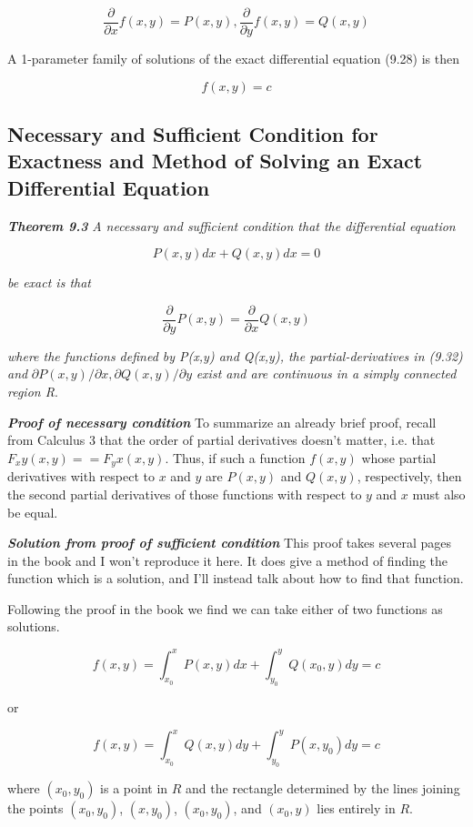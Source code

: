 \documentclass{article}
\begin{document}
\[ \tag{9.29} \frac{\partial}{\partial x}f(x,y) = P(x,y), \frac{\partial}{\partial y}f(x,y) = Q(x,y) \]

A 1-parameter family of solutions of the exact differential equation (9.28) is then

\[ \tag{9.291} f(x,y) = c \]

\subsection{Necessary and Sufficient Condition for Exactness and Method of Solving an Exact Differential Equation}

\emph{\textbf{Theorem 9.3}} \emph{A necessary and sufficient condition that the differential equation}

\[ \tag{9.31} P(x,y)dx + Q(x,y)dx = 0 \]

\emph{be exact is that}

\[ \tag{9.32} \frac{\partial}{\partial y}P(x,y) = \frac{\partial}{\partial x}Q(x,y) \]

\emph{where the functions defined by P(x,y) and Q(x,y), the \@{partial-derivatives} in (9.32) and} $\partial P(x,y)/\partial x, \partial Q(x,y)/\partial y$ \emph{exist and are \@{continuous} in a simply connected region R}.

\emph{\textbf{Proof of necessary condition}} To summarize an already brief proof, recall from Calculus 3 that the order of partial derivatives doesn't matter, i.e. that $F_xy(x,y) == F_yx(x,y)$. Thus, if such a function $f(x,y)$ whose partial derivatives with respect to $x$ and $y$ are $P(x,y)$ and $Q(x,y)$, respectively, then the second partial derivatives of those functions with respect to $y$ and $x$ must also be equal.

\emph{\textbf{Solution from proof of sufficient condition}} This proof takes several pages in the book and I won't reproduce it here. It does give a method of finding the function which is a solution, and I'll instead talk about how to find that function.

Following the proof in the book we find we can take either of two functions as solutions.

\[ \tag{9.45} f(x,y) = \int_{x_0}^x P(x,y)dx + \int_{y_0}^yQ(x_0,y)dy = c \]

or

\[ \tag{9.47} f(x,y) = \int_{x_0}^x Q(x,y)dy + \int_{y_0}^yP(x,y_0)dy = c \]

where $(x_0,y_0)$ is a point in $R$ and the rectangle determined by the lines joining the points $(x_0,y_0)$, $(x,y_0)$, $(x_0,y_0)$, and $(x_0,y)$ lies entirely in $R$.
\end{document}
